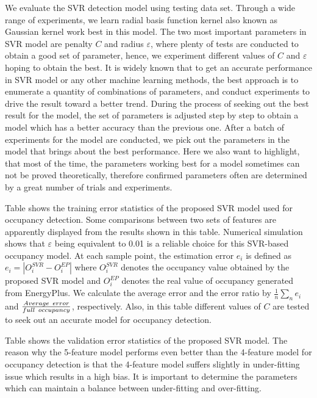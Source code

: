 We evaluate the SVR detection model using
testing data set. Through a wide range of experiments, we learn radial
basis function kernel also known as Gaussian kernel work best in this
model. The two most important parameters in SVR model are penalty $C$
and radius $\varepsilon$, where plenty of tests are conducted to obtain
a good set of parameter, hence, we experiment different values of $C$
and $\varepsilon$ hoping to obtain the best. It is widely known that
to get an accurate performance in SVR model or any other machine
learning methods, the best approach is to enumerate a quantity of
combinations of parameters, and conduct experiments to drive the
result toward a better trend. During the process of seeking out the
best result for the model, the set of parameters is adjusted step by
step to obtain a model which has a better accuracy than the previous
one. After a batch of experiments for the model are conducted, we pick
out the parameters in the model that brings about the best
performance. Here we also want to highlight, that most of the time,
the parameters working best for a model sometimes can not be proved
theoretically, therefore confirmed parameters often are determined by
a great number of trials and experiments.

Table  shows the training error statistics of the proposed SVR
model used for occupancy detection. Some comparisons between two sets
of features are apparently displayed from the results shown in this
table. Numerical simulation shows that $\varepsilon$ being equivalent
to 0.01 is a reliable choice for this SVR-based occupancy model. At
each sample point, the estimation error ${e_i}$ is defined as
${e_i} = \left| {O_i^{SVR} - O_i^{EP}} \right|$ where $O_i^{SVR}$
denotes the occupancy value obtained by the proposed SVR model and
$O_i^{EP}$ denotes the real value of occupancy generated from EnergyPlus. We calculate the average error and the error ratio by
$\frac{1}{n}\sum\nolimits_n {{e_i}}$ and
$\frac{{Average{\kern 1pt} {\kern 1pt} {\kern 1pt} {\kern 1pt}
    error}}{{full{\kern 1pt} {\kern 1pt} {\kern 1pt} {\kern 1pt}
    occupancy}}$,
respectively. Also, in this table different values of $C$ are tested
to seek out an accurate model for occupancy detection.

Table  shows the validation error statistics of the proposed SVR model. The reason why the 5-feature model performs even better than the 4-feature model for occupancy detection is that the 4-feature model suffers slightly in under-fitting issue which results in a high bias. It is important to determine the parameters which can maintain a balance between under-fitting and over-fitting.


